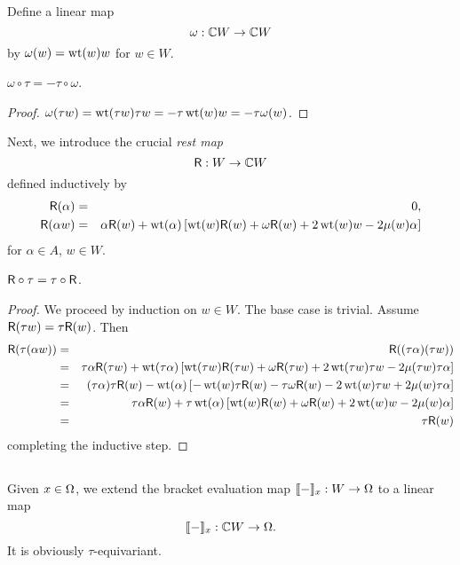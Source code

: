 Define a linear map
\[
    \omega : {{\mathbb{C}}{}W} \to {{\mathbb{C}}{}W}
\]
by $\omega(w)=\operatorname{\mathrm{wt}}(w)w$ for $w\in W$.

\begin{lem}
$\omega\circ\tau = -\tau\circ\omega$.
\end{lem}

\begin{proof}
        $\omega(\tau w)=\operatorname{\mathrm{wt}}(\tau w)\tau w = -\tau \operatorname{\mathrm{wt}}(w)w = -\tau\omega(w)$.
\end{proof}

Next, we introduce the crucial \emph{rest map}
\[
    \mathsf{R} : W \to {{\mathbb{C}}{}W}
\]
defined inductively by
\begin{eqnarray*}
        \mathsf{R}(\alpha) &=& 0,\\
        \mathsf{R}(\alpha w) &=& \alpha \mathsf{R}(w) + \operatorname{\mathrm{wt}}(\alpha) \left[\operatorname{\mathrm{wt}}(w) \mathsf{R}(w) + \omega \mathsf{R}(w) + 2 \operatorname{\mathrm{wt}}(w)w - 2\mu(w)\alpha\right]
\end{eqnarray*}
for $\alpha\in A$, $w\in W$.

\begin{lem} $\mathsf{R} \circ \tau = \tau \circ \mathsf{R}$. \end{lem}

\begin{proof} We proceed by induction on $w \in W$. The base case is trivial. Assume
$\mathsf{R}(\tau w)=\tau \mathsf{R}(w)$. Then
\begin{eqnarray*}
        \mathsf{R}(\tau (\alpha w)) &=& \mathsf{R}((\tau\alpha)(\tau w))\\
                            &=& \tau\alpha \mathsf{R}(\tau w) + \operatorname{\mathrm{wt}}(\tau\alpha) \left[\operatorname{\mathrm{wt}}(\tau w) \mathsf{R}(\tau w) + \omega  \mathsf{R}(\tau w) + 2 \operatorname{\mathrm{wt}}(\tau w) \tau w - 2 \mu(\tau w) \tau\alpha\right]\\
                            &=& (\tau\alpha) \tau\mathsf{R}(w) - \operatorname{\mathrm{wt}}(\alpha) \left[-\operatorname{\mathrm{wt}}(w) \tau\mathsf{R}(w) - \tau \omega  \mathsf{R}(w) - 2 \operatorname{\mathrm{wt}}(w) \tau w + 2 \mu(w) \tau\alpha\right]\\
                            &=& \tau \alpha \mathsf{R}(w) + \tau \operatorname{\mathrm{wt}}(\alpha)\left[\operatorname{\mathrm{wt}}(w) \mathsf{R}(w) + \omega  \mathsf{R}(w) + 2 \operatorname{\mathrm{wt}}(w) w - 2 \mu(w) \alpha\right]\\
                            &=& \tau \mathsf{R}(w)
\end{eqnarray*}
completing the inductive step.
\end{proof}

\subsection{}
Given $x\in\Omega$, we extend the bracket evaluation map $\llbracket{-}\rrbracket_x:W\to\Omega$
to a linear map
\[
        \llbracket{-}\rrbracket_x : {{\mathbb{C}}{}W} \to \Omega.
\]
It is obviously $\tau$-equivariant.

